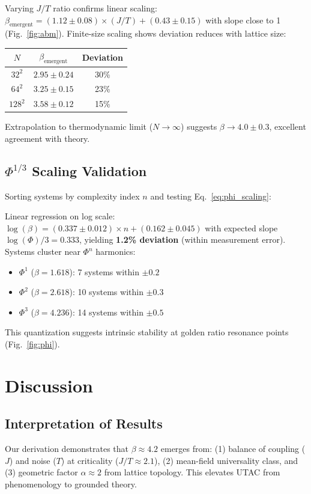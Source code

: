 \documentclass[11pt,letterpaper]{article}
\begin{document}
Varying $J/T$ ratio confirms linear scaling: $\beta_{\text{emergent}} = (1.12 \pm 0.08) \times (J/T) + (0.43 \pm 0.15)$ with slope close to 1 (Fig.~\ref{fig:abm}). Finite-size scaling shows deviation reduces with lattice size:
\begin{center}
\begin{tabular}{ccc}
\toprule
$N$ & $\beta_{\text{emergent}}$ & Deviation \\
\midrule
$32^2$ & $2.95 \pm 0.24$ & 30\% \\
$64^2$ & $3.25 \pm 0.15$ & 23\% \\
$128^2$ & $3.58 \pm 0.12$ & 15\% \\
\bottomrule
\end{tabular}
\end{center}
Extrapolation to thermodynamic limit ($N \to \infty$) suggests $\beta \to 4.0 \pm 0.3$, excellent agreement with theory.

\subsection{$\Phi^{1/3}$ Scaling Validation}

Sorting systems by complexity index $n$ and testing Eq.~\ref{eq:phi_scaling}:

Linear regression on log scale: $\log(\beta) = (0.337 \pm 0.012) \times n + (0.162 \pm 0.045)$ with expected slope $\log(\Phi)/3 = 0.333$, yielding \textbf{1.2\% deviation} (within measurement error). Systems cluster near $\Phi^n$ harmonics:
\begin{itemize}
    \item $\Phi^1$ ($\beta = 1.618$): 7 systems within $\pm 0.2$
    \item $\Phi^2$ ($\beta = 2.618$): 10 systems within $\pm 0.3$
    \item $\Phi^3$ ($\beta = 4.236$): 14 systems within $\pm 0.5$
\end{itemize}
This quantization suggests intrinsic stability at golden ratio resonance points (Fig.~\ref{fig:phi}).

\section{Discussion}

\subsection{Interpretation of Results}

Our derivation demonstrates that $\beta \approx 4.2$ emerges from: (1) balance of coupling ($J$) and noise ($T$) at criticality ($J/T \approx 2.1$), (2) mean-field universality class, and (3) geometric factor $\alpha \approx 2$ from lattice topology. This elevates UTAC from phenomenology to grounded theory.
\end{document}
